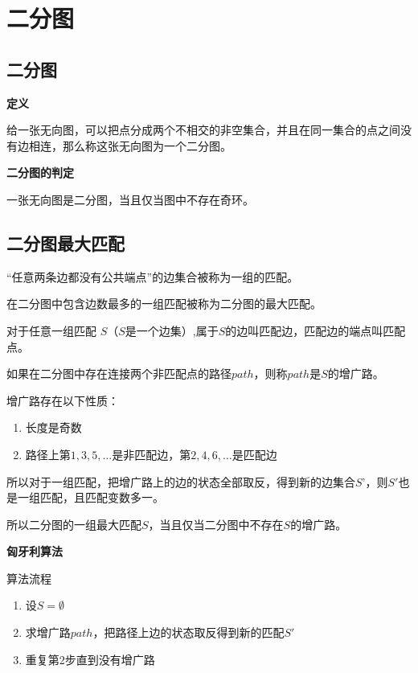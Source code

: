 \section{二分图}

\subsection{二分图}

\textbf{定义}

给一张无向图，可以把点分成两个不相交的非空集合，并且在同一集合的点之间没有边相连，那么称这张无向图为一个二分图。

\textbf{二分图的判定}

一张无向图是二分图，当且仅当图中不存在奇环。



\subsection{二分图最大匹配}

“任意两条边都没有公共端点”的边集合被称为一组的匹配。

在二分图中包含边数最多的一组匹配被称为二分图的最大匹配。

对于任意一组匹配 $S$（$S$是一个边集）,属于$S$的边叫匹配边，匹配边的端点叫匹配点。

如果在二分图中存在连接两个非匹配点的路径$path$，则称$path$是$S$的增广路。

增广路存在以下性质：
\begin{enumerate}
    \item 长度是奇数
    \item 路径上第$1,3,5,\dots$是非匹配边，第$2,4,6,\dots$是匹配边
\end{enumerate}

所以对于一组匹配，把增广路上的边的状态全部取反，得到新的边集合$S’$，则$S'$也是一组匹配，且匹配变数多一。

所以二分图的一组最大匹配$S$，当且仅当二分图中不存在$S$的增广路。

\textbf{匈牙利算法}

算法流程
\begin{enumerate}
    \item 设$S=\emptyset $
    \item 求增广路$path$，把路径上边的状态取反得到新的匹配$S'$
    \item 重复第2步直到没有增广路
\end{enumerate}

